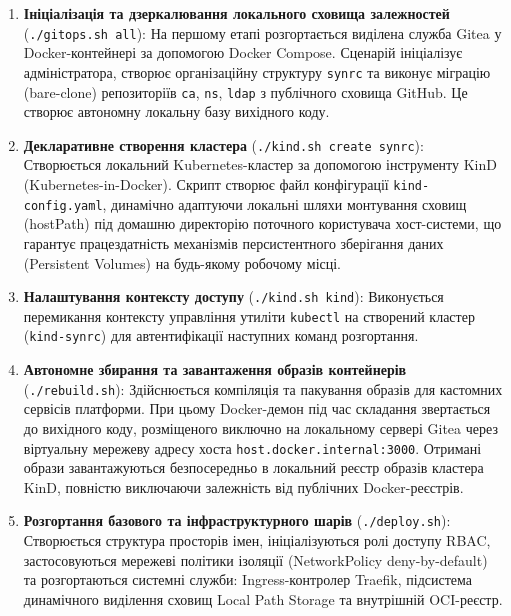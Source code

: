 \documentclass[12pt,a4paper]{article}
\begin{document}
\begin{enumerate}[leftmargin=1.5cm]
    \item \textbf{Ініціалізація та дзеркалювання локального сховища залежностей} (\texttt{./gitops.sh all}):
    На першому етапі розгортається виділена служба Gitea у Docker-контейнері за допомогою Docker Compose.
    Сценарій ініціалізує адміністратора, створює організаційну структуру \texttt{synrc} та виконує
    міграцію (bare-clone) репозиторіїв \texttt{ca}, \texttt{ns}, \texttt{ldap} з публічного сховища
    GitHub. Це створює автономну локальну базу вихідного коду.

    \item \textbf{Декларативне створення кластера} (\texttt{./kind.sh create synrc}):
    Створюється локальний Kubernetes-кластер за допомогою інструменту KinD (Kubernetes-in-Docker).
    Скрипт створює файл конфігурації \texttt{kind-config.yaml}, динамічно адаптуючи локальні шляхи
    монтування сховищ (hostPath) під домашню директорію поточного користувача хост-системи,
    що гарантує працездатність механізмів персистентного зберігання даних (Persistent Volumes) на будь-якому робочому місці.

    \item \textbf{Налаштування контексту доступу} (\texttt{./kind.sh kind}):
    Виконується перемикання контексту управління утиліти \texttt{kubectl} на створений
    кластер (\texttt{kind-synrc}) для автентифікації наступних команд розгортання.

    \item \textbf{Автономне збирання та завантаження образів контейнерів} (\texttt{./rebuild.sh}):
    Здійснюється компіляція та пакування образів для кастомних сервісів платформи.
    При цьому Docker-демон під час складання звертається до вихідного коду,
    розміщеного виключно на локальному сервері Gitea через віртуальну мережеву адресу
    хоста \texttt{host.docker.internal:3000}. Отримані образи завантажуються безпосередньо
    в локальний реєстр образів кластера KinD, повністю виключаючи залежність від публічних Docker-реєстрів.

    \item \textbf{Розгортання базового та інфраструктурного шарів} (\texttt{./deploy.sh}):
    Створюється структура просторів імен, ініціалізуються ролі доступу RBAC, застосовуються
    мережеві політики ізоляції (NetworkPolicy deny-by-default) та розгортаються системні служби:
    Ingress-контролер Traefik, підсистема динамічного виділення сховищ Local Path Storage та внутрішній OCI-реєстр.


\end{enumerate}
\end{document}
